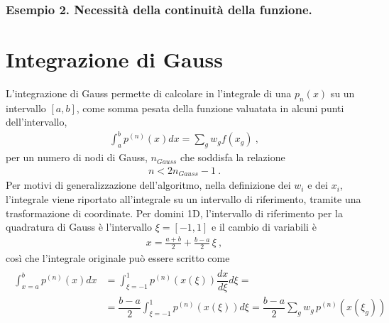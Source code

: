 \documentclass[letterpaper,10pt,italian]{jupyterBook}
\begin{document}
\subsubsection{Esempio 2. Necessità della continuità della funzione.}
\label{\detokenize{ch/numerics/integrals:esempio-2-necessita-della-continuita-della-funzione}}\label{\detokenize{ch/numerics/integrals:integrals-examples-continuity}}



\section{Integrazione di Gauss}
\label{\detokenize{ch/numerics/integrals:integrazione-di-gauss}}
\sphinxAtStartPar
L’integrazione di Gauss permette di calcolare in  l’integrale di una  \(p_n(x)\) su un intervallo \([a,b]\), come somma pesata della funzione valuatata in alcuni punti dell’intervallo,
\begin{equation*}
\begin{split}\int_a^b p^{(n)}(x) dx = \sum_{g} w_g f(x_g) \ ,\end{split}
\end{equation*}
\sphinxAtStartPar
per un numero di nodi di Gauss, \(n_{Gauss}\) che soddisfa la relazione
\begin{equation*}
\begin{split}n < 2 n_{Gauss} - 1 \ .\end{split}
\end{equation*}
\sphinxAtStartPar
Per motivi di generalizzazione dell’algoritmo, nella definizione dei  \(w_i\) e dei  \(x_i\), l’integrale viene riportato all’integrale su un intervallo di riferimento, tramite una trasformazione di coordinate.
Per domini 1D, l’intervallo di riferimento per la quadratura di Gauss è l’intervallo \(\xi = [-1, 1]\) e il cambio di variabili è
\begin{equation*}
\begin{split}x = \frac{a+b}{2} + \frac{b-a}{2} \, \xi \ ,\end{split}
\end{equation*}
\sphinxAtStartPar
così che l’integrale originale può essere scritto come
\begin{equation*}
\begin{split}\begin{aligned}
\int_{x=a}^b p^{(n)}(x) dx & = \int_{\xi = -1}^{1} p^(n) (x(\xi)) \dfrac{d x}{d\xi} d \xi = \\
 & = \dfrac{b-a}{2} \int_{\xi=-1}^{1} p^{(n)}(x(\xi)) d \xi = \dfrac{b-a}{2} \sum_{g} w_g \, p^{(n)}\left(x(\xi_g)\right)
\end{aligned}\end{split}
\end{equation*}
\end{document}
